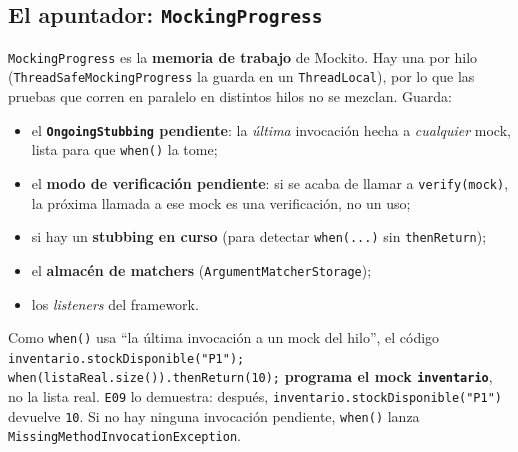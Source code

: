 \documentclass[11pt,a4paper,oneside]{report}
\newcommand{\code}[1]{\texttt{#1}}
\begin{document}
\subsection{El apuntador: \code{MockingProgress}}
\code{MockingProgress} es la \textbf{memoria de trabajo} de Mockito. Hay una por hilo (\code{ThreadSafeMockingProgress} la guarda en un \code{ThreadLocal}), por lo que las pruebas que corren en paralelo en distintos hilos no se mezclan. Guarda:
\begin{itemize}
  \item el \textbf{\code{OngoingStubbing} pendiente}: la \emph{última} invocación hecha a \emph{cualquier} mock, lista para que \code{when()} la tome;
  \item el \textbf{modo de verificación pendiente}: si se acaba de llamar a \code{verify(mock)}, la próxima llamada a ese mock es una verificación, no un uso;
  \item si hay un \textbf{stubbing en curso} (para detectar \code{when(...)} sin \code{thenReturn});
  \item el \textbf{almacén de matchers} (\code{ArgumentMatcherStorage});
  \item los \emph{listeners} del framework.
\end{itemize}

\begin{atencion}
Como \code{when()} usa ``la última invocación a un mock del hilo'', el código
\code{inventario.stockDisponible("P1"); when(listaReal.size()).thenReturn(10);}
\textbf{programa el mock \code{inventario}}, no la lista real. \code{E09} lo demuestra: después, \code{inventario.stockDisponible("P1")} devuelve \code{10}. Si no hay ninguna invocación pendiente, \code{when()} lanza \code{MissingMethodInvocationException}.
\end{atencion}
\end{document}
